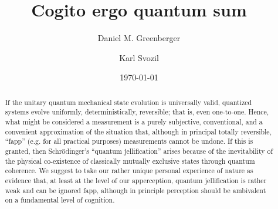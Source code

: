 \documentclass[%
 preprint,
 showpacs,
 showkeys,
 preprintnumbers,
 amsmath,amssymb,
 aps,
 pra,
  longbibliography,
 ]{revtex4-1}
\begin{document}
\title{Cogito ergo quantum sum}

\author{Daniel M. Greenberger}

\author{Karl Svozil}
 


\date{\today}

\begin{abstract}
If the unitary quantum mechanical state evolution is universally valid, quantized systems evolve uniformly, deterministically, reversible; that is, even one-to-one. Hence, what might be considered a measurement is a purely subjective, conventional, and a convenient approximation of the situation that, although in principal totally reversible, ``fapp'' (e.g. for all practical purposes) measurements cannot be undone. If this is granted, then Schr\"odinger's ``quantum jellification'' arises because of the inevitability of the physical co-existence of classically mutually exclusive states through quantum coherence. We suggest to take our rather unique personal experience of nature as evidence that, at least at the level of our apperception, quantum jellification is rather weak and can be ignored fapp, although in principle perception should be ambivalent on a fundamental level of cognition.
\end{abstract}

\maketitle



\end{document}
